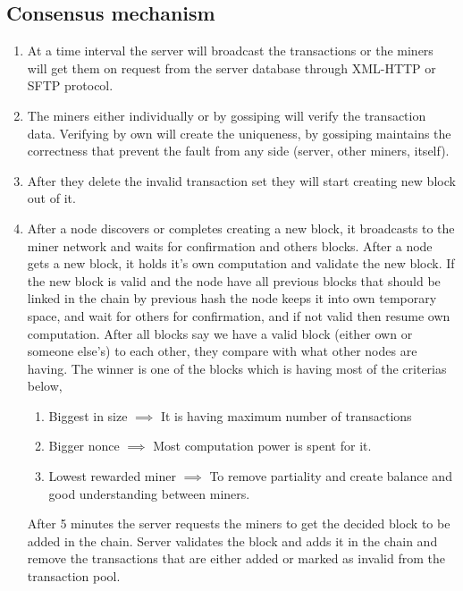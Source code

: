 \subsection{Consensus mechanism}
\begin{enumerate}
\item At a time interval the server will broadcast the transactions or the miners will get them on request from the server database through XML-HTTP or SFTP protocol.
\item The miners either individually or by gossiping will verify the transaction data. Verifying by own will create the uniqueness, by gossiping maintains the correctness that prevent the fault from any side (server, other miners, itself).
\item After they delete the invalid transaction set they will start creating new block out of it.
\item After a node discovers or completes creating a new block, it broadcasts to the miner network and waits for confirmation and others blocks. After a node gets a new block, it holds it's own computation and validate the new block. If the new block is valid and the node have all previous blocks that should be linked in the chain by previous hash the node keeps it into own temporary space, and wait for others for confirmation, and if not valid then resume own computation. After all blocks say we have a valid block (either own or someone else's) to each other, they compare with what other nodes are having. The winner is one of the blocks which is having most of the criterias below,
\begin{enumerate}
\item Biggest in size $\implies$ It is having maximum number of transactions
\item Bigger nonce $\implies$ Most computation power is spent for it.
\item Lowest rewarded miner $\implies$ To remove partiality and create balance and good understanding between miners.
\end{enumerate}
After 5 minutes the server requests the miners to get the decided block to be added in the chain. Server validates the block and adds it in the chain and remove the transactions that are either added or marked as invalid from the transaction pool.


\end{enumerate}

